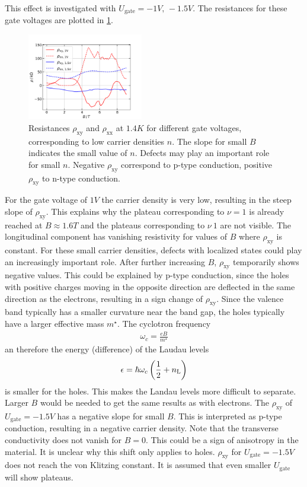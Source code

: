 This effect is investigated with $U_\text{gate}=-1V,\,-1.5V$.
The resistances for these gate voltages are plotted in \ref{fig:kaputteKurvenGateV}.
\begin{figure}[h]
    \centering
    \includegraphics[width=0.45\textwidth]{../Images/kaputteKurvenGateV.png}
    \caption{
        Resistances $\rho_\text{xy}$ and $\rho_\text{xx}$ at $1.4K$ for different gate voltages, corresponding to low carrier densities $n$.  
        The slope for small $B$ indicates the small value of $n$.
        Defects may play an important role for small $n$.
        Negative $\rho_\text{xy}$ correspond to p-type conduction, positive $\rho_\text{xy}$ to n-type conduction.}
    \label{fig:kaputteKurvenGateV}
\end{figure}
For the gate voltage of $1V$ the carrier density is very low, resulting in the steep slope of $\rho_\text{xy}$.
This explains why the plateau corresponding to $\nu=1$ is already reached at $B\approx1.6T$ and the plateaus corresponding to $\nu\>1$ are not visible.
The longitudinal component has vanishing resistivity for values of $B$ where $\rho_\text{xy}$ is constant.
For these small carrier densities, defects with localized states could play an increasingly important role.
After further increasing $B$, $\rho_\text{xy}$ temporarily shows negative values.
This could be explained by p-type conduction, since the holes with positive charges moving in the opposite direction are deflected in the same direction as the electrons, resulting in a sign change of $\rho_\text{xy}$.
Since the valence band typically has a smaller curvature near the band gap, the holes typically have a larger effective mass $m^\star$.
The cyclotron frequency
\begin{align}
    \omega_c = \frac{eB}{m^\star}    
\end{align}
an therefore the energy (difference) of the Laudau levels
\begin{align}
    \epsilon = \hbar \omega_c \left(\frac{1}{2} + n_\text L \right)
\end{align}
is smaller for the holes.
This makes the Landau levels more difficult to separate. 
Larger $B$ would be needed to get the same results as with electrons.
The $\rho_\text{xy}$ of $U_\text{gate} = -1.5V$ has a negative slope for small $B$.
This is interpreted as p-type conduction, resulting in a negative carrier density.
Note that the transverse conductivity does not vanish for $B=0$.
This could be a sign of anisotropy in the material.
It is unclear why this shift only applies to holes.
$\rho_\text{xy}$ for $U_\text{gate} = -1.5V$ does not reach the von Klitzing constant.
It is assumed that even smaller $U_\text{gate}$ will show plateaus.

